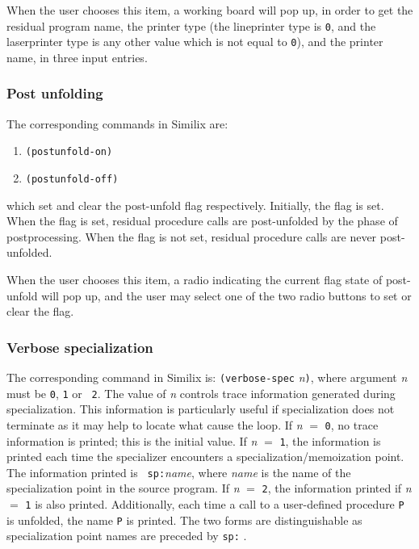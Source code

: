 \begin{sloppypar}
   When the user chooses this item, a working board will pop up, in
order to get the residual program name, the printer type (the
lineprinter type is {\tt 0}, and the laserprinter type is any other
value which is not equal to {\tt 0}), and the printer name, in three
input entries.



\subsubsection{Post unfolding}
\label{subsubsec-post-unfd}

The corresponding commands in Similix are:

\begin{enumerate}
\item {\tt (postunfold-on)}
\item {\tt (postunfold-off)}
\end{enumerate}

\noindent which set and clear the post-unfold flag respectively. Initially, the
flag is set. When the flag is set, residual procedure calls are
post-unfolded by the phase of postprocessing. When the flag is not
set, residual procedure calls are never post-unfolded.

   When the user chooses this item, a radio indicating the current
flag state of post-unfold will pop up, and the user may select one of
the two radio buttons to set or clear the flag.



\subsubsection{Verbose specialization}
\label{subsubsec-verb-spec}

The corresponding command in Similix is: {\tt (verbose-spec} {\it
n}{\tt )}, where argument {\it n} must be {\tt 0}, {\tt 1} or {\tt
2}. The value of {\it n} controls trace information generated during
specialization. This information is particularly useful if
specialization does not terminate as it may help to locate what cause
the loop. If {\it n} $=$ {\tt 0}, no trace information is printed;
this is the initial value. If {\it n} $=$ {\tt 1}, the information is
printed each time the specializer encounters a
specialization/memoization point.  The information printed is {\tt
sp:}{\it name}, where {\it name} is the name of the specialization
point in the source program. If {\it n} $=$ {\tt 2}, the information
printed if {\it n} $=$ {\tt 1} is also printed. Additionally, each
time a call to a user-defined procedure {\tt P} is unfolded, the name
{\tt P} is printed. The two forms are distinguishable as
specialization point names are preceded by {\tt sp:} .


\end{sloppypar}

